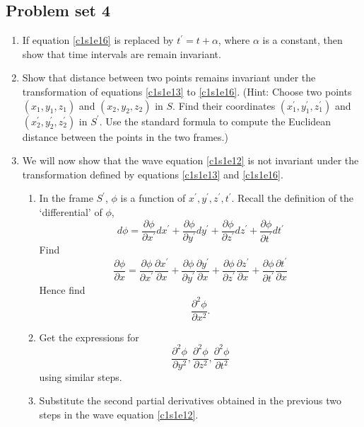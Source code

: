 \subsection{Problem set 4}
\begin{enumerate}
\item If equation \eqref{c1s1e16} is replaced by $t^\prime = t + \alpha$, where
$\alpha$ is a constant, then show that time intervals are remain invariant.
\item Show that distance between two points remains invariant under the 
transformation of equations \eqref{c1s1e13} to \eqref{c1s1e16}. (Hint: Choose
two points $(x_1, y_1, z_1)$ and $(x_2, y_2, z_2)$ in $S$. Find their 
coordinates $(x_1^\prime, y_1^\prime, z_1^\prime)$ and $(x_2^\prime, 
y_2^\prime, z_2^\prime)$ in $S^\prime$. Use the standard formula to compute the
Euclidean distance between the points in the two frames.)
\item We will now show that the wave equation \eqref{c1s1e12} is not invariant
under the transformation defined by equations \eqref{c1s1e13} and 
\eqref{c1s1e16}.
\begin{enumerate}
\item In the frame $S^\prime$, $\phi$ is a function of $x^\prime, y^\prime, 
z^\prime, t^\prime$. Recall the definition of the 
`differential' of $\phi$,
\[
d\phi = \frac{\partial\phi}{\partial x^\prime}dx^\prime + 
\frac{\partial\phi}{\partial y^\prime}dy^\prime + 
\frac{\partial\phi}{\partial z^\prime}dz^\prime + 
\frac{\partial\phi}{\partial t^\prime}dt^\prime 
\]
Find
\[
\frac{\partial\phi}{\partial x} = \frac{\partial\phi}{\partial x^\prime}
\frac{\partial x^\prime}{\partial x} + \frac{\partial\phi}{\partial y^\prime}
\frac{\partial y^\prime}{\partial x} + \frac{\partial\phi}{\partial z^\prime}
\frac{\partial z^\prime}{\partial x} + \frac{\partial\phi}{\partial t^\prime}
\frac{\partial t^\prime}{\partial x}
\]
Hence find
\[
\frac{\partial^2\phi}{\partial {x}^2}.
\]
\item Get the expressions for
\[
\frac{\partial^2\phi}{\partial {y}^2}, \frac{\partial^2\phi}{\partial {z}^2},
\frac{\partial^2\phi}{\partial {t}^2}
\]
using similar steps.
\item Substitute the second partial derivatives obtained in the previous two
steps in the wave equation \eqref{c1s1e12}.
\end{enumerate}
\end{enumerate}

